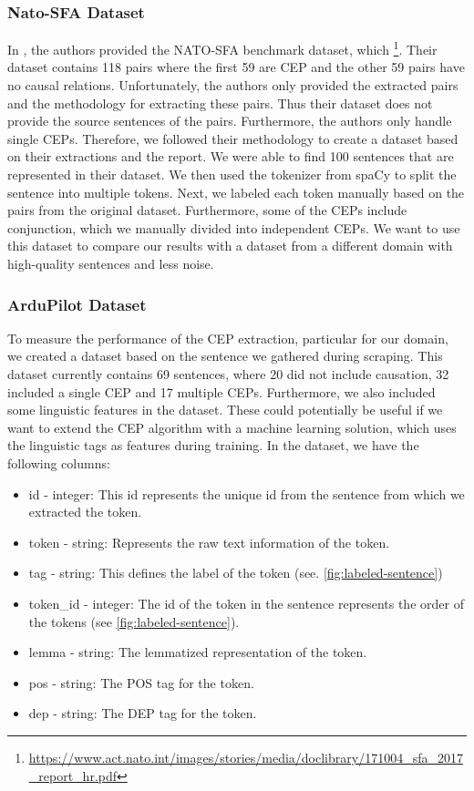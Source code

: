 \subsubsection{Nato-SFA Dataset}\label{subsubsec:nato-sfa}
In \cite{Hassanzadeh19}, the authors provided the \ac{NATO-SFA} benchmark dataset, which \footnote{\url{https://www.act.nato.int/images/stories/media/doclibrary/171004_sfa_2017_report_hr.pdf}}.
Their dataset contains 118 pairs where the first 59 are \ac{CEP} and the other 59 pairs have no causal relations.
Unfortunately, the authors only provided the extracted pairs and the methodology for extracting these pairs.
Thus their dataset does not provide the source sentences of the pairs.
Furthermore, the authors only handle single \ac{CEP}s.
Therefore, we followed their methodology to create a dataset based on their extractions and the report.
We were able to find 100 sentences that are represented in their dataset.
We then used the tokenizer from spaCy to split the sentence into multiple tokens.
Next, we labeled each token manually based on the pairs from the original dataset.
Furthermore, some of the \ac{CEP}s include conjunction, which we manually divided into independent \ac{CEP}s.
We want to use this dataset to compare our results with a dataset from a different domain with high-quality sentences and less noise.

\subsubsection{ArduPilot Dataset}\label{subsubsec:ardupilot}
To measure the performance of the \ac{CEP} extraction, particular for our domain, we created a dataset based on the sentence we gathered during scraping.
This dataset currently contains 69 sentences, where 20 did not include causation, 32 included a single \ac{CEP} and 17 multiple \ac{CEP}s.
Furthermore, we also included some linguistic features in the dataset.
These could potentially be useful if we want to extend the \ac{CEP} algorithm with a machine learning solution, which uses the linguistic tags as features during training.
In the dataset, we have the following columns:
\begin{itemize}
    \item id - integer: This id represents the unique id from the sentence from which we extracted the token.
    \item token - string: Represents the raw text information of the token.
    \item tag - string: This defines the label of the token (see. \autoref{fig:labeled-sentence})
    \item token\_id - integer: The id of the token in the sentence represents the order of the tokens (see \autoref{fig:labeled-sentence}).
    \item lemma  - string: The lemmatized representation of the token.
    \item pos  - string: The \ac{POS} tag for the token.
    \item dep  - string: The \ac{DEP} tag for the token.
\end{itemize}


